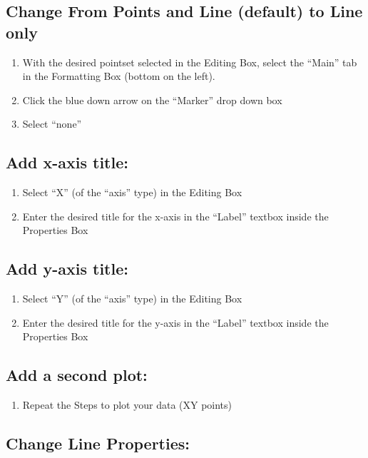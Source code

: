 \subsection{Change From Points and Line (default) to Line only}

\begin{enumerate}
\item With the desired pointset selected in the Editing Box, select the ``Main'' tab in the Formatting Box (bottom on the left).
\item Click the blue down arrow on the ``Marker'' drop down box
\item Select ``none''
\end{enumerate}

\subsection{Add x-axis title:}

\begin{enumerate}
\item Select ``X'' (of the ``axis'' type) in the Editing Box
\item Enter the desired title for the x-axis in the ``Label'' textbox inside the Properties Box
\end{enumerate}

\subsection{Add y-axis title:}

\begin{enumerate}
\item Select ``Y'' (of the ``axis'' type) in the Editing Box
\item Enter the desired title for the y-axis in the ``Label'' textbox inside the Properties Box
\end{enumerate}

\subsection{Add a second plot:}

\begin{enumerate}
\item Repeat the Steps to plot your data (XY points)
\end{enumerate}

\subsection{Change Line Properties:}

